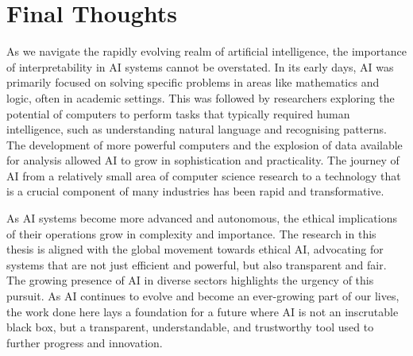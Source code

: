 \section{Final Thoughts}
As we navigate the rapidly evolving realm of artificial intelligence, the importance of interpretability in AI systems cannot be overstated. In its early days, AI was primarily focused on solving specific problems in areas like mathematics and logic, often in academic settings. This was followed by researchers exploring the potential of computers to perform tasks that typically required human intelligence, such as understanding natural language and recognising patterns. The development of more powerful computers and the explosion of data available for analysis allowed AI to grow in sophistication and practicality. The journey of AI from a relatively small area of computer science research to a technology that is a crucial component of many industries has been rapid and transformative.

As AI systems become more advanced and autonomous, the ethical implications of their operations grow in complexity and importance. The research in this thesis is aligned with the global movement towards ethical AI, advocating for systems that are not just efficient and powerful, but also transparent and fair. The growing presence of AI in diverse sectors highlights the urgency of this pursuit. As AI continues to evolve and become an ever-growing part of our lives, the work done here lays a foundation for a future where AI is not an inscrutable black box, but a transparent, understandable, and trustworthy tool used to further progress and innovation.